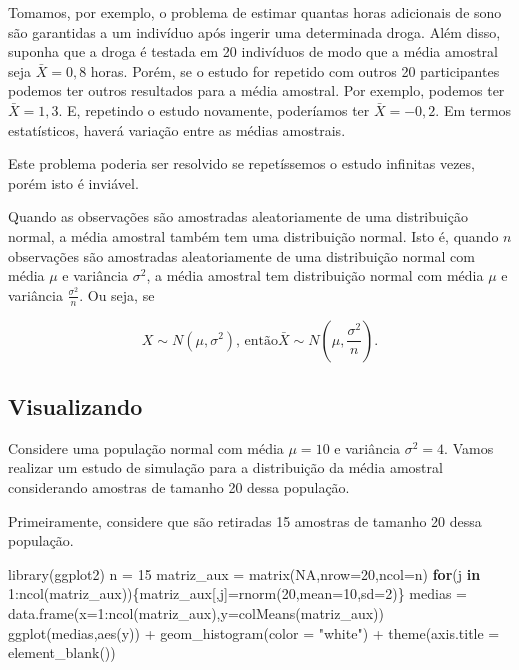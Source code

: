 \documentclass[
]{book}
\newenvironment{Shaded}{\begin{snugshade}}{\end{snugshade}}
\newcommand{\AttributeTok}[1]{\textcolor[rgb]{0.77,0.63,0.00}{#1}}
\newcommand{\ConstantTok}[1]{\textcolor[rgb]{0.00,0.00,0.00}{#1}}
\newcommand{\ControlFlowTok}[1]{\textcolor[rgb]{0.13,0.29,0.53}{\textbf{#1}}}
\newcommand{\DecValTok}[1]{\textcolor[rgb]{0.00,0.00,0.81}{#1}}
\newcommand{\FunctionTok}[1]{\textcolor[rgb]{0.00,0.00,0.00}{#1}}
\newcommand{\NormalTok}[1]{#1}
\newcommand{\OtherTok}[1]{\textcolor[rgb]{0.56,0.35,0.01}{#1}}
\newcommand{\SpecialCharTok}[1]{\textcolor[rgb]{0.00,0.00,0.00}{#1}}
\newcommand{\StringTok}[1]{\textcolor[rgb]{0.31,0.60,0.02}{#1}}
\begin{document}
Tomamos, por exemplo, o problema de estimar quantas horas adicionais de sono são garantidas a um indivíduo após ingerir uma determinada droga. Além disso, suponha que a droga é testada em 20 indivíduos de modo que a média amostral seja \(\bar X=0,8\) horas. Porém, se o estudo for repetido com outros 20 participantes podemos ter outros resultados para a média amostral. Por exemplo, podemos ter \(\bar X=1,3\). E, repetindo o estudo novamente, poderíamos ter \(\bar X=-0,2\). Em termos estatísticos, haverá variação entre as médias amostrais.

Este problema poderia ser resolvido se repetíssemos o estudo infinitas vezes, porém isto é inviável.

Quando as observações são amostradas aleatoriamente de uma distribuição normal, a média amostral também tem uma distribuição normal. Isto é, quando \(n\) observações são amostradas aleatoriamente de uma distribuição normal com média \(\mu\) e variância \(\sigma^2\), a média amostral tem distribuição normal com média \(\mu\) e variância \(\frac{\sigma^2}{n}\). Ou seja, se

\[X\sim N(\mu,\sigma^2)\text{, então} \bar X \sim N\left(\mu,\frac{\sigma^2}{n}\right).\]

\hypertarget{visualizando}{%
\subsection{Visualizando}\label{visualizando}}

Considere uma população normal com média \(\mu=10\) e variância \(\sigma^2=4\). Vamos realizar um estudo de simulação para a distribuição da média amostral considerando amostras de tamanho 20 dessa população.

Primeiramente, considere que são retiradas 15 amostras de tamanho 20 dessa população.

\begin{Shaded}
\begin{Highlighting}[]
\FunctionTok{library}\NormalTok{(ggplot2)}
\NormalTok{n }\OtherTok{=} \DecValTok{15}
\NormalTok{matriz\_aux }\OtherTok{=} \FunctionTok{matrix}\NormalTok{(}\ConstantTok{NA}\NormalTok{,}\AttributeTok{nrow=}\DecValTok{20}\NormalTok{,}\AttributeTok{ncol=}\NormalTok{n)}
\ControlFlowTok{for}\NormalTok{(j }\ControlFlowTok{in} \DecValTok{1}\SpecialCharTok{:}\FunctionTok{ncol}\NormalTok{(matriz\_aux))\{matriz\_aux[,j]}\OtherTok{=}\FunctionTok{rnorm}\NormalTok{(}\DecValTok{20}\NormalTok{,}\AttributeTok{mean=}\DecValTok{10}\NormalTok{,}\AttributeTok{sd=}\DecValTok{2}\NormalTok{)\}}
\NormalTok{medias }\OtherTok{=} \FunctionTok{data.frame}\NormalTok{(}\AttributeTok{x=}\DecValTok{1}\SpecialCharTok{:}\FunctionTok{ncol}\NormalTok{(matriz\_aux),}\AttributeTok{y=}\FunctionTok{colMeans}\NormalTok{(matriz\_aux))}
\FunctionTok{ggplot}\NormalTok{(medias,}\FunctionTok{aes}\NormalTok{(y)) }\SpecialCharTok{+}
  \FunctionTok{geom\_histogram}\NormalTok{(}\AttributeTok{color =} \StringTok{"white"}\NormalTok{) }\SpecialCharTok{+}
  \FunctionTok{theme}\NormalTok{(}\AttributeTok{axis.title =} \FunctionTok{element\_blank}\NormalTok{())}
\end{Highlighting}
\end{Shaded}
\end{document}
